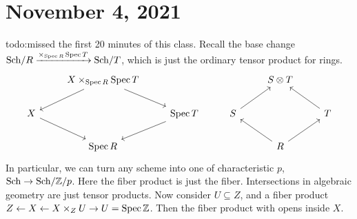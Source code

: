 \section{November 4, 2021} 
{\color{red}todo:missed the first 20 minutes of this class.} Recall the base change $\mathrm{Sch} / R \xrightarrow{\times _{\operatorname{Spec} R}\operatorname{Spec} T}\mathrm{Sch} / T $, which is just the ordinary tensor product for rings. 
\[
\begin{tikzcd}
             & X \times_{\Spec R} \Spec T \arrow[ld] \arrow[rd] &                    &              & S\otimes T              &              \\
X \arrow[rd] &                                                  & \Spec T \arrow[ld] & S \arrow[ru] &                         & T \arrow[lu] \\
             & \Spec R                                          &                    &              & R \arrow[lu] \arrow[ru] &             
\end{tikzcd}
\] 
In particular, we can turn any scheme into one of characteristic $p$, $\mathrm{Sch} \to \mathrm{Sch} / \mathbb{Z} / p $. Here the fiber product is just the fiber.
Intersections in algebraic geometry are just tensor products. Now consider $U \subseteq Z$, and a fiber product $Z \leftarrow X \leftarrow X \times _ZU \rightarrow U=\operatorname{Spec} \mathbb{Z}$. Then the fiber product with opens inside $X$.

